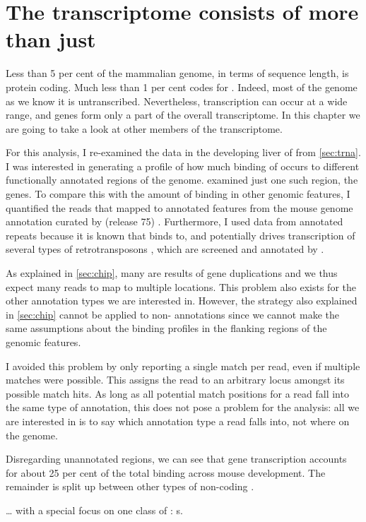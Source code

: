 \chapter{The  transcriptome consists of more than just }

Less than \num{5} per cent of the mammalian genome, in terms of sequence length,
is protein coding. Much less than \num{1} per cent codes for \trna[s]. Indeed,
most of the genome as we know it is untranscribed\todo[ref]{}. Nevertheless,
 transcription can occur at a wide range, and \trna genes form only a part
of the overall  transcriptome. In this chapter we are going to take a look
at other members of the  transcriptome.

For this analysis, I re-examined the \chipseq data in the developing liver of
\mmu from \cref{sec:trna}. I was interested in generating a profile of how much
binding of  occurs to different functionally annotated regions of the
genome.  examined just one such region, the \trna genes. To
compare this with the amount of binding in other genomic features, I quantified
the \chipseq reads that mapped to annotated features from the 
mouse genome annotation curated by  (release \num{75})
\citep{Flicek:2014}. Furthermore, I used data from annotated repeats because it
is known that  binds to, and potentially drives transcription of several
types of retrotransposons \citep{Carriere:2012}, which are screened and
annotated by  \citep{Smit:2014}.

As explained in \cref{sec:chip}, many \trna[s] are results of gene duplications
and we thus expect many reads to map to multiple locations. This problem also
exists for the other annotation types we are interested in. However, the
strategy also explained in \cref{sec:chip} cannot be applied to non-\trna
annotations since we cannot make the same assumptions about the binding
profiles in the flanking regions of the genomic features.

I avoided this problem by only reporting a single match per read, even if
multiple matches were possible. This assigns the read to an arbitrary locus
amongst its possible match hits. As long as all potential match positions for a
read fall into the same type of annotation, this does not pose a problem for the
analysis: all we are interested in is to say which annotation type a read falls
into, not where on the genome.


Disregarding unannotated regions, we can see that \trna gene transcription
accounts for about \num{25} per cent of the total  binding across mouse
development. The remainder is split up between other types of non-coding
\rna[s].

… with a special focus on one class
of : s.

